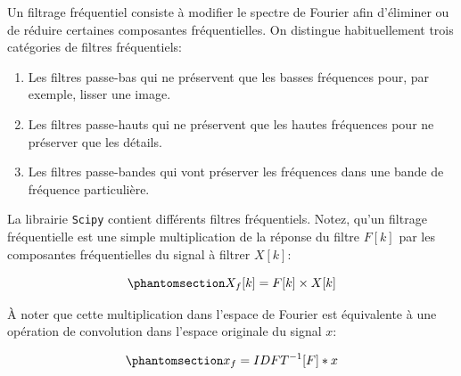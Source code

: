 \documentclass[
  11pt,
  letterpaper,
  open=any,
  twoside=false,
  french]{scrbook}
\begin{document}
Un filtrage fréquentiel consiste à modifier le spectre de Fourier afin
d'éliminer ou de réduire certaines composantes fréquentielles. On
distingue habituellement trois catégories de filtres fréquentiels:

\begin{enumerate}
\def\labelenumi{\arabic{enumi}.}
\item
  Les filtres passe-bas qui ne préservent que les basses fréquences
  pour, par exemple, lisser une image.
\item
  Les filtres passe-hauts qui ne préservent que les hautes fréquences
  pour ne préserver que les détails.
\item
  Les filtres passe-bandes qui vont préserver les fréquences dans une
  bande de fréquence particulière.
\end{enumerate}

La librairie \texttt{Scipy} contient différents filtres fréquentiels.
Notez, qu'un filtrage fréquentielle est une simple multiplication de la
réponse du filtre \(F[k]\) par les composantes fréquentielles du signal
à filtrer \(X[k]\):

\begin{equation}\phantomsection\label{eq-fourier-filter}{
X_f[k] = F[k] \times X[k]
}\end{equation}

À noter que cette multiplication dans l'espace de Fourier est
équivalente à une opération de convolution dans l'espace originale du
signal \(x\):

\begin{equation}\phantomsection\label{eq-convolve}{
x_f = IDFT^{-1}[F]*x
}\end{equation}
\end{document}
